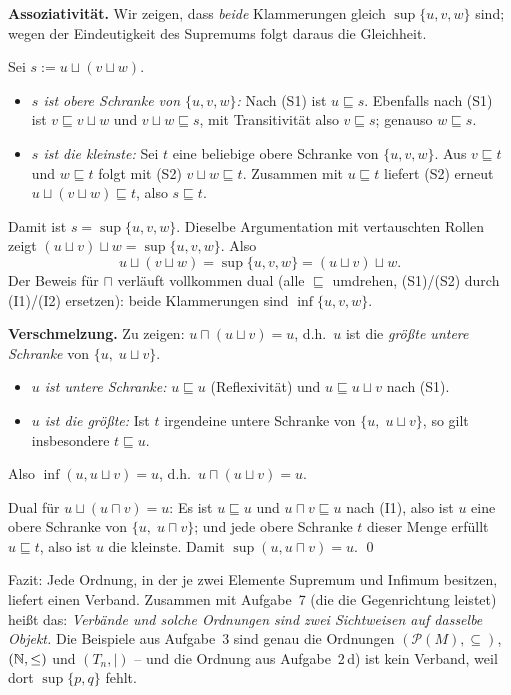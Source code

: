 \begin{loesung}
\begin{enumerate}[a)]
  \textbf{Assoziativität.} Wir zeigen, dass \emph{beide} Klammerungen gleich $\sup\{u,v,w\}$ sind; wegen der Eindeutigkeit des Supremums folgt daraus die Gleichheit.

  Sei $s:=u\sqcup(v\sqcup w)$.
  \begin{itemize}
    \item \emph{$s$ ist obere Schranke von $\{u,v,w\}$:} Nach (S1) ist $u\sqsubseteq s$. Ebenfalls nach (S1) ist $v\sqsubseteq v\sqcup w$ und $v\sqcup w\sqsubseteq s$, mit Transitivität also $v\sqsubseteq s$; genauso $w\sqsubseteq s$.
    \item \emph{$s$ ist die kleinste:} Sei $t$ eine beliebige obere Schranke von $\{u,v,w\}$. Aus $v\sqsubseteq t$ und $w\sqsubseteq t$ folgt mit (S2) $v\sqcup w\sqsubseteq t$. Zusammen mit $u\sqsubseteq t$ liefert (S2) erneut $u\sqcup(v\sqcup w)\sqsubseteq t$, also $s\sqsubseteq t$.
  \end{itemize}
  Damit ist $s=\sup\{u,v,w\}$. Dieselbe Argumentation mit vertauschten Rollen zeigt $(u\sqcup v)\sqcup w=\sup\{u,v,w\}$. Also
  \[u\sqcup(v\sqcup w)=\sup\{u,v,w\}=(u\sqcup v)\sqcup w.\]
  Der Beweis für $\sqcap$ verläuft vollkommen dual (alle $\sqsubseteq$ umdrehen, (S1)/(S2) durch (I1)/(I2) ersetzen): beide Klammerungen sind $\inf\{u,v,w\}$.

  \textbf{Verschmelzung.} Zu zeigen: $u\sqcap(u\sqcup v)=u$, d.h.\ $u$ ist die \emph{größte untere Schranke} von $\{u,\;u\sqcup v\}$.
  \begin{itemize}
    \item \emph{$u$ ist untere Schranke:} $u\sqsubseteq u$ (Reflexivität) und $u\sqsubseteq u\sqcup v$ nach (S1).
    \item \emph{$u$ ist die größte:} Ist $t$ irgendeine untere Schranke von $\{u,\;u\sqcup v\}$, so gilt insbesondere $t\sqsubseteq u$.
  \end{itemize}
  Also $\inf(u,u\sqcup v)=u$, d.h.\ $u\sqcap(u\sqcup v)=u$.

  Dual für $u\sqcup(u\sqcap v)=u$: Es ist $u\sqsubseteq u$ und $u\sqcap v\sqsubseteq u$ nach (I1), also ist $u$ eine obere Schranke von $\{u,\;u\sqcap v\}$; und jede obere Schranke $t$ dieser Menge erfüllt $u\sqsubseteq t$, also ist $u$ die kleinste. Damit $\sup(u,u\sqcap v)=u$. \qed

  Fazit: Jede Ordnung, in der je zwei Elemente Supremum und Infimum besitzen, liefert einen Verband. Zusammen mit Aufgabe~7 (die die Gegenrichtung leistet) heißt das: \emph{Verbände und solche Ordnungen sind zwei Sichtweisen auf dasselbe Objekt.} Die Beispiele aus Aufgabe~3 sind genau die Ordnungen $(\mathcal{P}(M),\subseteq)$, $(\mathbb{N},\leq)$ und $(T_n,\mid)$ -- und die Ordnung aus Aufgabe~2\,d) ist kein Verband, weil dort $\sup\{p,q\}$ fehlt.
\end{enumerate}
\end{loesung}

